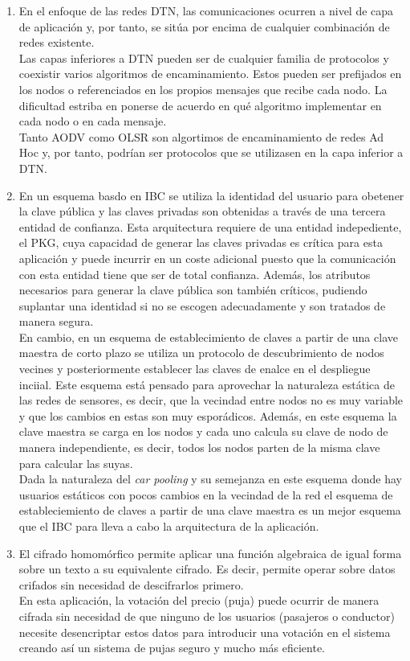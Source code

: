 \documentclass[10pt,a4paper]{article}
\begin{document}
\begin{enumerate}
\item En el enfoque de las redes DTN, las comunicaciones ocurren a nivel de capa de aplicación y, por tanto, se sitúa por encima de cualquier combinación de redes existente.\\
Las capas inferiores a DTN pueden ser de cualquier familia de protocolos y coexistir varios algoritmos de encaminamiento. Estos pueden ser prefijados en los nodos o referenciados en los propios mensajes que recibe cada nodo. La dificultad estriba en ponerse de acuerdo en qué algoritmo implementar en cada nodo o en cada mensaje.\\
Tanto AODV como OLSR son algortimos de encaminamiento de redes Ad Hoc y, por tanto, podrían ser protocolos que se utilizasen en la capa inferior a DTN.

\item En un esquema basdo en IBC se utiliza la identidad del usuario para obetener la clave pública y las claves privadas son obtenidas a través de una tercera entidad de confianza. Esta arquitectura requiere de una entidad indepediente, el PKG, cuya capacidad de generar las claves privadas es crítica para esta aplicación y puede incurrir en un coste adicional puesto que la comunicación con esta entidad tiene que ser de total confianza. Además, los atributos necesarios para generar la clave pública son también críticos, pudiendo suplantar una identidad si no se escogen adecuadamente y son tratados de manera segura.\\
En cambio, en un esquema de establecimiento de claves a partir de una clave maestra de corto plazo se utiliza un protocolo de descubrimiento de nodos vecines y posteriormente establecer las claves de enalce en el despliegue inciial. Este esquema está pensado para aprovechar la naturaleza estática de las redes de sensores, es decir, que la vecindad entre nodos no es muy variable y que los cambios en estas son muy esporádicos. Además, en este esquema la clave maestra se carga en los nodos y cada uno calcula su clave de nodo de manera independiente, es decir, todos los nodos parten de la misma clave para calcular las suyas.\\
Dada la naturaleza del \textit{car pooling} y su semejanza en este esquema donde hay usuarios estáticos con pocos cambios en la vecindad de la red el esquema de estableciemiento de claves a partir de una clave maestra es un mejor esquema que el IBC para lleva a cabo la arquitectura de la aplicación.
\item El cifrado homomórfico permite aplicar una función algebraica de igual forma sobre un texto a su equivalente cifrado. Es decir, permite operar sobre datos crifados sin necesidad de descifrarlos primero.\\
En esta aplicación, la votación del precio (puja) puede ocurrir de manera cifrada sin necesidad de que ninguno de los usuarios (pasajeros o conductor) necesite desencriptar estos datos para introducir una votación en el sistema creando así un sistema de pujas seguro y mucho más eficiente.
\end{enumerate}
\end{document}
